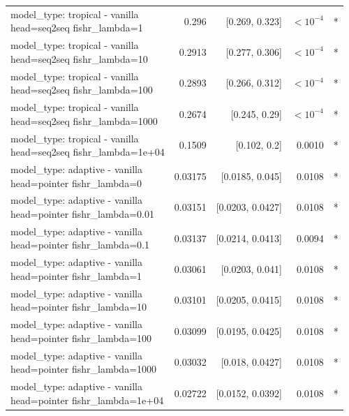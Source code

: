 \documentclass[10pt]{article}
\makeatletter
\newcommand{\stackcell}[1]{\begin{tabular}[t]{@{}l@{}}#1\end{tabular}}
\makeatother
\begin{document}
{\begin{longtable}{lrrrl}
\stackcell{model\_type: tropical - vanilla\\\footnotesize head=seq2seq fishr\_lambda=1 } & 0.296 & [0.269, 0.323] & $<10^{-4}$ & *\\
\stackcell{model\_type: tropical - vanilla\\\footnotesize head=seq2seq fishr\_lambda=10 } & 0.2913 & [0.277, 0.306] & $<10^{-4}$ & *\\
\stackcell{model\_type: tropical - vanilla\\\footnotesize head=seq2seq fishr\_lambda=100 } & 0.2893 & [0.266, 0.312] & $<10^{-4}$ & *\\
\stackcell{model\_type: tropical - vanilla\\\footnotesize head=seq2seq fishr\_lambda=1000 } & 0.2674 & [0.245, 0.29] & $<10^{-4}$ & *\\
\stackcell{model\_type: tropical - vanilla\\\footnotesize head=seq2seq fishr\_lambda=1e+04 } & 0.1509 & [0.102, 0.2] & 0.0010 & *\\
\stackcell{model\_type: adaptive - vanilla\\\footnotesize head=pointer fishr\_lambda=0 } & 0.03175 & [0.0185, 0.045] & 0.0108 & *\\
\stackcell{model\_type: adaptive - vanilla\\\footnotesize head=pointer fishr\_lambda=0.01 } & 0.03151 & [0.0203, 0.0427] & 0.0108 & *\\
\stackcell{model\_type: adaptive - vanilla\\\footnotesize head=pointer fishr\_lambda=0.1 } & 0.03137 & [0.0214, 0.0413] & 0.0094 & *\\
\stackcell{model\_type: adaptive - vanilla\\\footnotesize head=pointer fishr\_lambda=1 } & 0.03061 & [0.0203, 0.041] & 0.0108 & *\\
\stackcell{model\_type: adaptive - vanilla\\\footnotesize head=pointer fishr\_lambda=10 } & 0.03101 & [0.0205, 0.0415] & 0.0108 & *\\
\stackcell{model\_type: adaptive - vanilla\\\footnotesize head=pointer fishr\_lambda=100 } & 0.03099 & [0.0195, 0.0425] & 0.0108 & *\\
\stackcell{model\_type: adaptive - vanilla\\\footnotesize head=pointer fishr\_lambda=1000 } & 0.03032 & [0.018, 0.0427] & 0.0108 & *\\
\stackcell{model\_type: adaptive - vanilla\\\footnotesize head=pointer fishr\_lambda=1e+04 } & 0.02722 & [0.0152, 0.0392] & 0.0108 & *\\

\end{longtable}}
\end{document}
